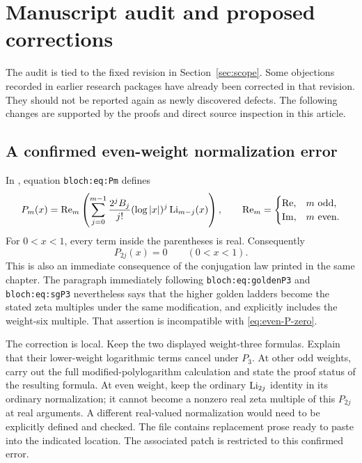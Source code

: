 \section{Manuscript audit and proposed corrections}
\label{sec:audit}

The audit is tied to the fixed revision in Section~\ref{sec:scope}.
Some objections recorded in earlier research packages have already been
corrected in that revision. They should not be reported again as newly
discovered defects. The following changes are supported by the proofs
and direct source inspection in this article.

\subsection{A confirmed even-weight normalization error}

In , equation
\texttt{bloch:eq:Pm} defines
\[
 P_m(x)=\operatorname{Re}_m\left(
  \sum_{j=0}^{m-1}\frac{2^jB_j}{j!}
       (\log|x|)^j\operatorname{Li}_{m-j}(x)\right),
 \qquad
 \operatorname{Re}_m=
 \begin{cases}\operatorname{Re},&m\text{ odd},\\
 \operatorname{Im},&m\text{ even}.
 \end{cases}
\]
For $0<x<1$, every term inside the parentheses is real. Consequently
\begin{equation}\label{eq:even-P-zero}
 P_{2j}(x)=0\qquad(0<x<1).
\end{equation}
This is also an immediate consequence of the conjugation law printed
in the same chapter. The paragraph immediately following
\texttt{bloch:eq:goldenP3} and \texttt{bloch:eq:sgP3} nevertheless says
that the higher golden ladders become the stated zeta multiples under
the same modification, and explicitly includes the weight-six multiple.
That assertion is incompatible with \eqref{eq:even-P-zero}.

The correction is local. Keep the two displayed weight-three formulas.
Explain that their lower-weight logarithmic terms cancel under $P_3$.
At other odd weights, carry out the full modified-polylogarithm
calculation and state the proof status of the resulting formula. At
even weight, keep the ordinary $\operatorname{Li}_{2j}$ identity in its ordinary
normalization; it cannot become a nonzero real zeta multiple of this
$P_{2j}$ at real arguments. A different real-valued normalization would
need to be explicitly defined and checked. The file
 contains replacement
prose ready to paste into the indicated location. The associated patch
is restricted to this confirmed error.

